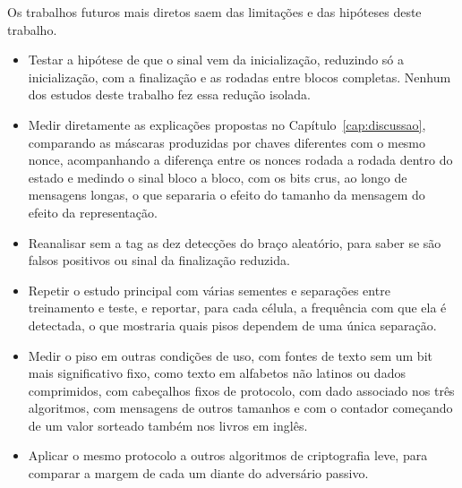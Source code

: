 Os trabalhos futuros mais diretos saem das limitações e das hipóteses deste trabalho.
\begin{itemize}
\item Testar a hipótese de que o sinal vem da inicialização, reduzindo só a inicialização, com a finalização e as rodadas entre blocos completas. Nenhum dos estudos deste trabalho fez essa redução isolada.
\item Medir diretamente as explicações propostas no Capítulo~\ref{cap:discussao}, comparando as máscaras produzidas por chaves diferentes com o mesmo nonce, acompanhando a diferença entre os nonces rodada a rodada dentro do estado e medindo o sinal bloco a bloco, com os bits crus, ao longo de mensagens longas, o que separaria o efeito do tamanho da mensagem do efeito da representação.
\item Reanalisar sem a tag as dez detecções do braço aleatório, para saber se são falsos positivos ou sinal da finalização reduzida.
\item Repetir o estudo principal com várias sementes e separações entre treinamento e teste, e reportar, para cada célula, a frequência com que ela é detectada, o que mostraria quais pisos dependem de uma única separação.
\item Medir o piso em outras condições de uso, com fontes de texto sem um bit mais significativo fixo, como texto em alfabetos não latinos ou dados comprimidos, com cabeçalhos fixos de protocolo, com dado associado nos três algoritmos, com mensagens de outros tamanhos e com o contador começando de um valor sorteado também nos livros em inglês.
\item Aplicar o mesmo protocolo a outros algoritmos de criptografia leve, para comparar a margem de cada um diante do adversário passivo.
\end{itemize}
